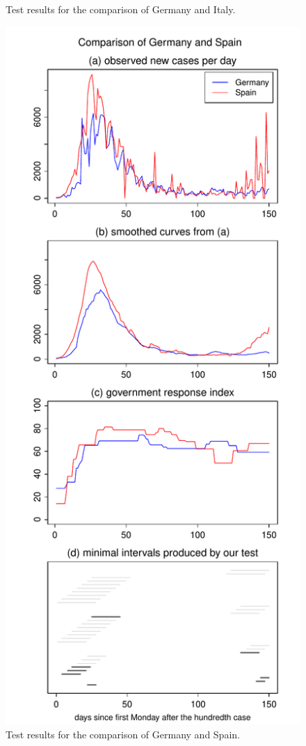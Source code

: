 \documentclass[a4paper,12pt]{article}
\numberwithin{equation}{section}
\begin{document}
\begin{figure}[p!]
\begin{minipage}[t]{0.49\textwidth}
\caption{Test results for the comparison of Germany and Italy.}\label{fig:Germany:Italy}
\end{minipage}
\hspace{0.25cm}
\begin{minipage}[t]{0.49\textwidth}
\includegraphics[width=\textwidth]{plots/DEU_vs_ESP_Monday}
\caption{Test results for the comparison of Germany and Spain.}\label{fig:Germany:Spain}
\end{minipage}


\end{figure}
\end{document}
